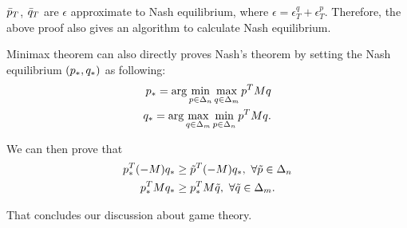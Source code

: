 \documentclass[../main.tex]{subfiles}
\begin{document}
	\begin{corollary}
		$\bar{p}_T$, $\bar{q}_T$ are $\epsilon$ approximate to Nash equilibrium, where $\epsilon = \epsilon_T^q + \epsilon_T^p$. Therefore, the above proof also gives an algorithm to calculate Nash equilibrium.
	\end{corollary}
	
	\begin{corollary}
		Minimax theorem can also directly proves Nash's theorem by setting the Nash equilibrium $(p_*, q_*)$ as following:
		\begin{equation*}
			\begin{aligned}
				p_* = \arg\min\limits_{p \in \Delta_n} \max\limits_{q \in \Delta_m} p^T M q\\ 
				q_* = \arg \max\limits_{q \in \Delta_m} 	\min\limits_{p \in \Delta_n} p^T M q.
			\end{aligned}
		\end{equation*}
		
		We can then prove that 
		\begin{equation*}
			\begin{aligned}
				\p_*^T(-M) \qb_* &\geq \tilde{\p}^T (-M) \qb_*,\ \forall \tilde{\p} \in \Delta_n \\
				\p_*^T M \qb_* &\geq \p_*^T M \tilde{\qb},\ \forall \tilde{\qb} \in \Delta_m 	.
			\end{aligned}
		\end{equation*}
	\end{corollary}

	That concludes our discussion about game theory.
\end{document}
